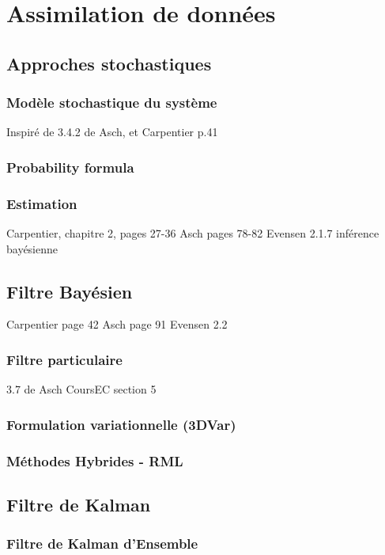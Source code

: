 \documentclass{article}
\begin{document}
\section{Assimilation de données}

\subsection{Approches stochastiques}

\subsubsection{Modèle stochastique du système}

Inspiré de 3.4.2 de Asch, et Carpentier p.41
\subsubsection{Probability formula}

\subsubsection{Estimation}

Carpentier, chapitre 2, pages 27-36
Asch pages 78-82
Evensen 2.1.7 inférence bayésienne
\subsection{Filtre Bayésien}

Carpentier page 42
Asch page 91
Evensen 2.2
\subsubsection{Filtre particulaire}

3.7 de Asch
CoursEC section 5
\subsubsection{Formulation variationnelle (3DVar)}

\subsubsection{Méthodes Hybrides - RML}

\subsection{Filtre de Kalman}

\subsubsection{Filtre de Kalman d'Ensemble}
\end{document}

